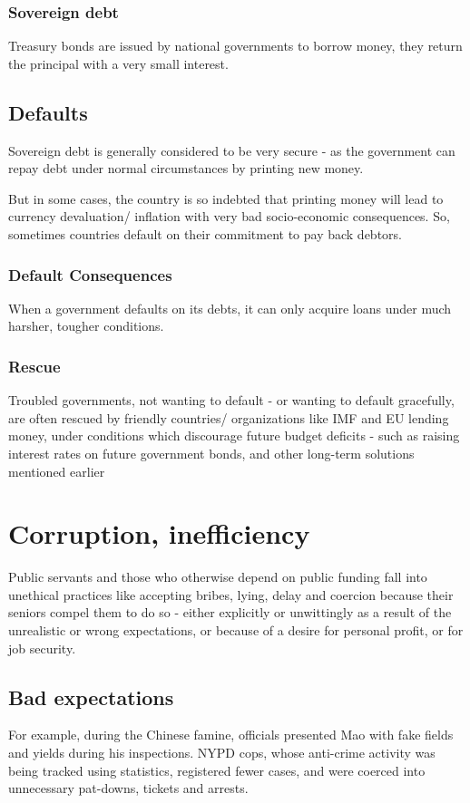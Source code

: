 \documentclass[oneside, article]{memoir}
\begin{document}
\subsubsection{Sovereign debt}
Treasury bonds are issued by national governments to borrow money, they return the principal with a very small interest.

\subsection{Defaults}
Sovereign debt is generally considered to be very secure - as the government can repay debt under normal circumstances by printing new money.

But in some cases, the country is so indebted that printing money will lead to currency devaluation/ inflation with very bad socio-economic consequences. So, sometimes countries default on their commitment to pay back debtors.

\subsubsection{Default Consequences}
When a government defaults on its debts, it can only acquire loans under much harsher, tougher conditions.

\subsubsection{Rescue}
Troubled governments, not wanting to default - or wanting to default gracefully, are often rescued by friendly countries/ organizations like IMF and EU lending money, under conditions which discourage future budget deficits - such as raising interest rates on future government bonds, and other long-term solutions mentioned earlier

\section{Corruption, inefficiency}
Public servants and those who otherwise depend on public funding fall into unethical practices like accepting bribes, lying, delay and coercion because their seniors compel them to do so - either explicitly or unwittingly as a result of the unrealistic or wrong expectations, or because of a desire for personal profit, or for job security.

\subsection{Bad expectations}
For example, during the Chinese famine, officials presented Mao with fake fields and yields during his inspections. NYPD cops, whose anti-crime activity was being tracked using statistics, registered fewer cases, and were coerced into unnecessary pat-downs, tickets and arrests.
\end{document}
